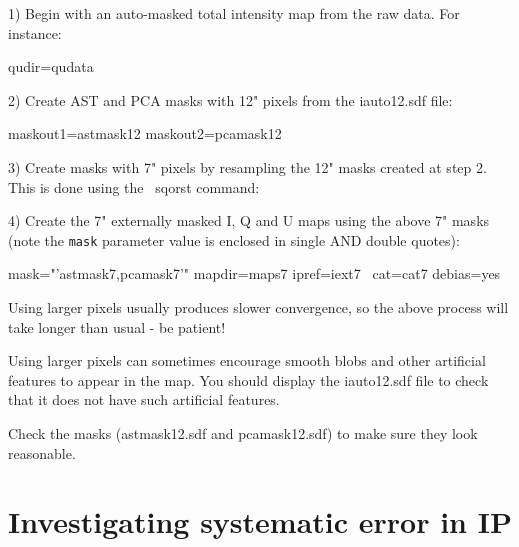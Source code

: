 1) Begin with an auto-masked total intensity map from the raw data. For instance:

\begin{terminalv}
                    qudir=qudata
\end{terminalv}


2) Create AST and PCA masks with 12" pixels from the iauto12.sdf file:


\begin{terminalv}
                   maskout1=astmask12 maskout2=pcamask12
\end{terminalv}

3) Create masks with 7" pixels by resampling the 12" masks created at
step 2. This is done using the \Kappa\ sqorst command:

\begin{terminalv}
\end{terminalv}

4) Create the 7" externally masked I, Q and U maps using the above 7"
masks (note the \texttt{mask} parameter value  is enclosed in single AND
double quotes):

\begin{terminalv}
                  mask="'astmask7,pcamask7'" mapdir=maps7 ipref=iext7  \
                  cat=cat7 debias=yes
\end{terminalv}


\begin{tip}
Using larger pixels usually produces slower convergence, so the
above process will take longer than usual - be patient!

Using larger pixels can sometimes encourage smooth blobs and other
artificial features to appear in the map. You should display the
iauto12.sdf file to check that it does not have such artificial
features.

Check the masks (astmask12.sdf and pcamask12.sdf) to make sure
they look reasonable.
\end{tip}

\section{Investigating systematic error in IP}


